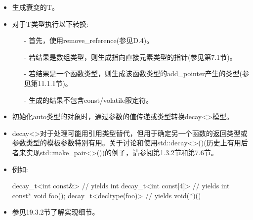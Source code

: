 \begin{itemize}
\item
生成衰变的T。

\item
对于T类型执行以下转换:

\begin{itemize}
\item[-]
首先，使用remove\_reference(参见D.4)。

\item[-]
若结果是数组类型，则生成指向直接元素类型的指针(参见第7.1节)。

\item[-]
若结果是一个函数类型，则生成该函数类型的add\_pointer产生的类型(参见第11.1.1节)。

\item[-]
生成的结果不包含const/volatile限定符。
\end{itemize}

\item
初始化auto类型的对象时，通过参数的值传递或类型转换decay<>模型。

\item
decay<>对于处理可能用引用类型替代，但用于确定另一个函数的返回类型或参数类型的模板参数特别有用。关于讨论和使用std::decay<>()(历史上有用后者来实现std::make\_pair<>())的例子，请参阅第1.3.2节和第7.6节。

\item
例如:
\begin{cpp}
decay_t<int const&> // yields int
decay_t<int const[4]> // yields int const*
void foo();
decay_t<decltype(foo)> // yields void(*)()
\end{cpp}

\item
参见19.3.2节了解实现细节。
\end{itemize}















